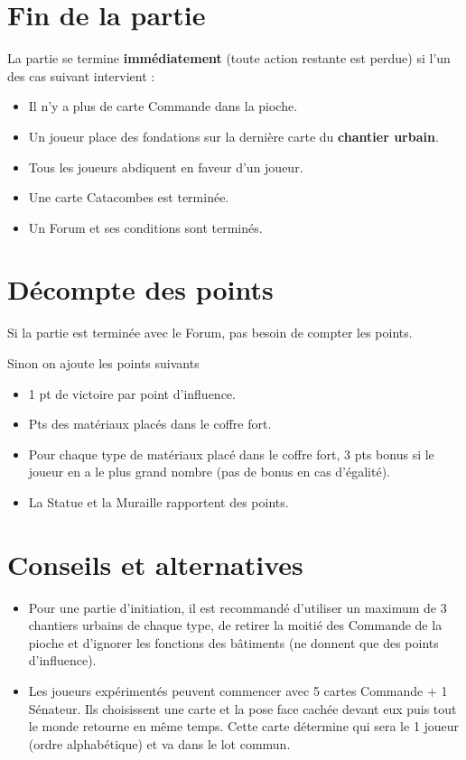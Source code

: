 \documentclass[10pt, a4paper]{article}	%
\begin{document}
\begin{multicols}{3}
\section{Fin de la partie}
La partie se termine \textbf{immédiatement} (toute action restante est perdue) si l'un des cas suivant intervient :
\begin{itemize}
\item Il n'y a plus de carte Commande dans la pioche.
\item Un joueur place des fondations sur la dernière carte du \textbf{chantier urbain}.
\item Tous les joueurs abdiquent en faveur d'un joueur.
\item Une carte Catacombes est terminée.
\item Un Forum et ses conditions sont terminés.
\end{itemize}



\section{Décompte des points}
Si la partie est terminée avec le Forum, pas besoin de compter les points.

Sinon on ajoute les points suivants
\begin{itemize}
\item 1 pt de victoire par point d'influence.
\item Pts des matériaux placés dans le coffre fort.
\item Pour chaque type de matériaux placé dans le coffre fort, 3 pts bonus si le joueur en a le plus grand nombre (pas de bonus en cas d'égalité).
\item La Statue et la Muraille rapportent des points.
\end{itemize}



\section{Conseils et alternatives}
\begin{itemize}
\item Pour une partie d'initiation, il est recommandé d'utiliser un maximum de 3 chantiers urbains de chaque type, de retirer la moitié des Commande de la pioche et d'ignorer les fonctions des bâtiments (ne donnent que des points d'influence).
\item Les joueurs expérimentés peuvent commencer avec 5 cartes Commande + 1 Sénateur. Ils choisissent une carte et la pose face cachée devant eux puis tout le monde retourne en même temps. Cette carte détermine qui sera le 1\ier{} joueur (ordre alphabétique) et va dans le lot commun.
\end{itemize}


\end{multicols}
\end{document}
